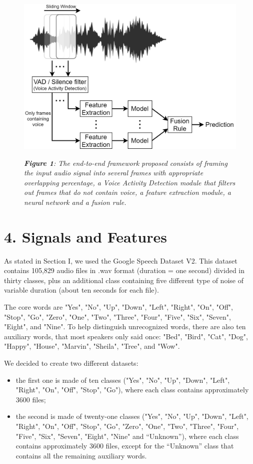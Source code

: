 \documentclass[conference]{IEEEtran}
\begin{document}
\begin{figure}
\centering
\includegraphics[scale=0.27]{End-To-End}

\begin{small}\textit{\textbf{Figure 1}: The end-to-end framework proposed consists of framing the input audio signal into several frames with appropriate overlapping percentage, a Voice Activity Detection module that filters out frames that do not contain voice, a feature extraction module, a neural network and a fusion rule.}
\end{small}
\end{figure}

\section{4.	Signals and Features}
As stated in Section I, we used the Google Speech Dataset V2. This dataset contains 105,829 audio files in .wav format (duration =  one second) divided in thirty classes, plus an additional class containing five different type of noise of variable duration (about ten seconds for each file).

The core words are "Yes", "No", "Up", "Down", "Left", "Right", "On", "Off", "Stop", "Go", "Zero", "One", "Two", "Three", "Four", "Five", "Six", "Seven", "Eight", and "Nine". To help distinguish unrecognized words, there are also ten auxiliary words, that most speakers only said once: "Bed", "Bird", "Cat", "Dog", "Happy", "House", "Marvin", "Sheila", "Tree", and "Wow".

We decided to create two different datasets:
\begin{itemize}
\item the first one is made of ten classes ("Yes", "No", "Up", "Down", "Left", "Right", "On", "Off", "Stop", "Go"), where each class contains approximately 3600 files;
\item the second is made of twenty-one classes ("Yes", "No", "Up", "Down", "Left", "Right", "On", "Off", "Stop", "Go", "Zero", "One", "Two", "Three", "Four", "Five", "Six", "Seven", "Eight", "Nine" and “Unknown”), where each class contains approximately 3600 files, except for the “Unknown” class that contains all the remaining auxiliary words.
\end{itemize}
\end{document}
